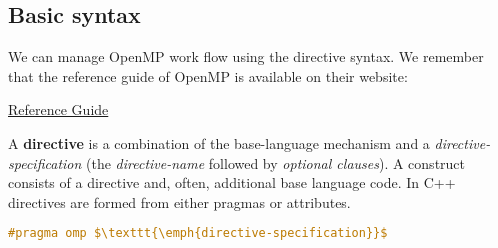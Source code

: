 \subsection{Basic syntax}

We can manage OpenMP work flow using the directive syntax. We remember that the reference guide of OpenMP is available on their website:
\begin{center}
    \href{https://www.openmp.org/resources/refguides/}{Reference Guide} \hspace{2em} 
\end{center}

\highspace
A \textbf{directive} is a combination of the base-language mechanism and a \emph{directive-specification} (the \emph{directive-name} followed by \emph{optional clauses}). A construct consists of a directive and, often, additional base language code. In C++ directives are formed from either pragmas or attributes.
\begin{openmpbox}
\begin{lstlisting}[language=C++, mathescape=true]
#pragma omp $\texttt{\emph{directive-specification}}$
\end{lstlisting}
\end{openmpbox}

